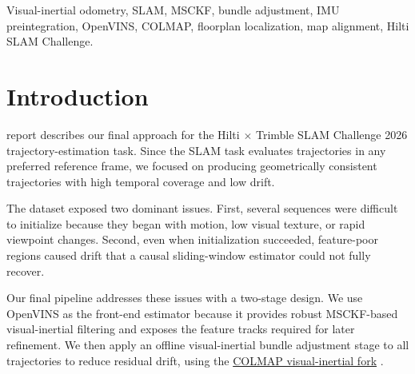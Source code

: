 \documentclass[journal]{IEEEtran}
\begin{document}
\begin{IEEEkeywords}
Visual-inertial odometry, SLAM, MSCKF, bundle adjustment, IMU preintegration, OpenVINS, COLMAP,
floorplan localization, map alignment, Hilti SLAM Challenge.
\end{IEEEkeywords}


%
\IEEEpeerreviewmaketitle


\section{Introduction}
%
%
%
%
 report describes our final approach for the Hilti
$\times$ Trimble SLAM Challenge 2026 trajectory-estimation task.
Since the SLAM task evaluates trajectories in any preferred reference frame,
we focused on producing geometrically consistent trajectories with high
temporal coverage and low drift.

The dataset exposed two dominant issues.
First, several sequences were difficult to initialize because they began with
motion, low visual texture, or rapid viewpoint changes.
Second, even when initialization succeeded, feature-poor regions caused drift
that a causal sliding-window estimator could not fully recover.

Our final pipeline addresses these issues with a two-stage design.
We use OpenVINS \cite{geneva2020openvins} as the front-end estimator because
it provides robust MSCKF-based visual-inertial filtering and exposes the
feature tracks required for later refinement.
We then apply an offline visual-inertial bundle adjustment stage to all
trajectories to reduce residual drift, using the
\href{https://github.com/B1ueber2y/colmap/tree/features/imu}{COLMAP visual-inertial fork}
\cite{schoenberger2016sfm}.
\end{document}
